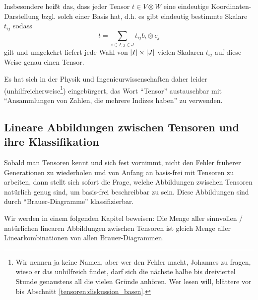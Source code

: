 \begin{remark}\label{tensoren:index_notation}
Insbesondere heißt das, dass jeder Tensor $t\in V\otimes W$ eine eindeutige Koordinaten-Darstellung bzgl. solch einer Basis hat, d.h. es gibt eindeutig bestimmte Skalare $t_{ij}$ sodass
\[t = \sum_{i\in I, j\in J} t_{ij} b_i\otimes c_j\]
gilt und umgekehrt liefert jede Wahl von $\lvert I\rvert\times \lvert J\rvert$ vielen Skalaren $t_{ij}$ auf diese Weise genau einen Tensor.

Es hat sich in der Physik und Ingenieurwissenschaften daher leider (unhilfreicherweise\footnote{Wir nennen ja keine Namen, aber wer den Fehler macht, Johannes zu fragen, wieso er das unhilfreich findet, darf sich die nächste halbe bis dreiviertel Stunde genaustens all die vielen Gründe anhören. Wer lesen will, blättere vor bis Abschnitt \ref{tensoren:diskussion_basen}.}) eingebürgert, das Wort \enquote{Tensor} austauschbar mit \enquote{Ansammlungen von Zahlen, die mehrere Indizes haben} zu verwenden.
\end{remark}

\subsection{Lineare Abbildungen zwischen Tensoren und ihre Klassifikation}

\begin{remark}\label{brauer:bem:klassifikation}
Sobald man Tensoren kennt und sich fest vornimmt, nicht den Fehler früherer Generationen zu wiederholen und von Anfang an basis-frei mit Tensoren zu arbeiten, dann stellt sich sofort die Frage, welche Abbildungen zwischen Tensoren natürlich genug sind, um basis-frei beschreibbar zu sein. Diese Abbildungen sind durch \enquote{Brauer-Diagramme} klassifizierbar.

Wir werden in einem folgenden Kapitel beweisen: Die Menge aller sinnvollen / natürlichen linearen Abbildungen zwischen Tensoren ist gleich Menge aller Linearkombinationen von allen Brauer-Diagrammen.
\end{remark}


